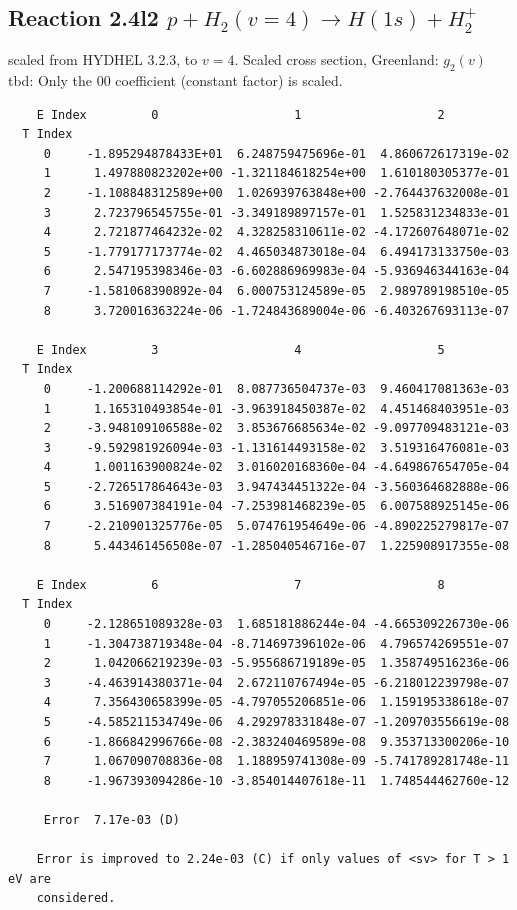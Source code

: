 \documentclass[12pt,dvipdfmx]{article}
\begin{document}
\subsection{
Reaction 2.4l2 $   p + H_2(v=4) \rightarrow H(1s) + H_2^+$}
scaled from HYDHEL 3.2.3, to $v=4$. Scaled cross section, Greenland: \cite{kn:Green} $g_2(v)$
tbd:
Only the 00 coefficient (constant factor) is scaled.


\begin{small}\begin{verbatim}
    E Index         0                   1                   2
  T Index
     0     -1.895294878433E+01  6.248759475696e-01  4.860672617319e-02
     1      1.497880823202e+00 -1.321184618254e+00  1.610180305377e-01
     2     -1.108848312589e+00  1.026939763848e+00 -2.764437632008e-01
     3      2.723796545755e-01 -3.349189897157e-01  1.525831234833e-01
     4      2.721877464232e-02  4.328258310611e-02 -4.172607648071e-02
     5     -1.779177173774e-02  4.465034873018e-04  6.494173133750e-03
     6      2.547195398346e-03 -6.602886969983e-04 -5.936946344163e-04
     7     -1.581068390892e-04  6.000753124589e-05  2.989789198510e-05
     8      3.720016363224e-06 -1.724843689004e-06 -6.403267693113e-07

    E Index         3                   4                   5
  T Index
     0     -1.200688114292e-01  8.087736504737e-03  9.460417081363e-03
     1      1.165310493854e-01 -3.963918450387e-02  4.451468403951e-03
     2     -3.948109106588e-02  3.853676685634e-02 -9.097709483121e-03
     3     -9.592981926094e-03 -1.131614493158e-02  3.519316476081e-03
     4      1.001163900824e-02  3.016020168360e-04 -4.649867654705e-04
     5     -2.726517864643e-03  3.947434451322e-04 -3.560364682888e-06
     6      3.516907384191e-04 -7.253981468239e-05  6.007588925145e-06
     7     -2.210901325776e-05  5.074761954649e-06 -4.890225279817e-07
     8      5.443461456508e-07 -1.285040546716e-07  1.225908917355e-08

    E Index         6                   7                   8
  T Index
     0     -2.128651089328e-03  1.685181886244e-04 -4.665309226730e-06
     1     -1.304738719348e-04 -8.714697396102e-06  4.796574269551e-07
     2      1.042066219239e-03 -5.955686719189e-05  1.358749516236e-06
     3     -4.463914380371e-04  2.672110767494e-05 -6.218012239798e-07
     4      7.356430658399e-05 -4.797055206851e-06  1.159195338618e-07
     5     -4.585211534749e-06  4.292978331848e-07 -1.209703556619e-08
     6     -1.866842996766e-08 -2.383240469589e-08  9.353713300206e-10
     7      1.067090708836e-08  1.188959741308e-09 -5.741789281748e-11
     8     -1.967393094286e-10 -3.854014407618e-11  1.748544462760e-12

     Error  7.17e-03 (D)

    Error is improved to 2.24e-03 (C) if only values of <sv> for T > 1 eV are
    considered.
\end{verbatim}\end{small}
\newpage
\end{document}
